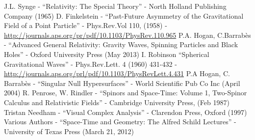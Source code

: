 \documentclass[floatfix,aps,prd,amsmath,amssymb]{revtex4}
\begin{document}
\begin{thebibliography}{10}
J.L. Synge - ``Relativity: The Special Theory'' - North Holland Publishing Company (1965)
D. Finkelstein - ``Past-Future Asymmetry of the Gravitational Field of a Point Particle'' - Phys.Rev.Vol 110, (1958) - \url{http://journals.aps.org/pr/pdf/10.1103/PhysRev.110.965}
P.A. Hogan, C.Barrab\`es - ``Advanced General Relativity: Gravity Waves, Spinning Particles and Black Holes'' - Oxford University Press (May 2013) 
I. Robinson ``Spherical Gravitational Waves'' - Phys.Rev.Lett. 4 (1960) 431-432 - \url{http://journals.aps.org/prl/pdf/10.1103/PhysRevLett.4.431}
P.A Hogan, C. Barrab\`es - ``Singular Null Hypersurfaces'' - World Scientific Pub Co Inc (April 2004)
R. Penrose, W. Rindler - ``Spinors and Space-Time: Volume 1, Two-Spinor Calculus and Relativistic Fields'' - Cambridge University Press, (Feb 1987)
Tristan Needham - ``Visual Complex Analysis'' - Clarendon Press, Oxford (1997)
Various Authors - ``Space-Time and Geometry: The Alfred Schild Lectures'' - University of Texas Press (March 21, 2012)
\end{thebibliography}
\end{document}
